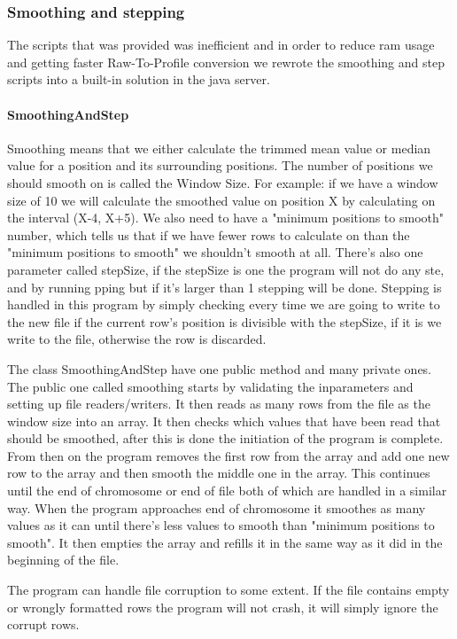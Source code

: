 \subsubsection{Smoothing and stepping}
The scripts that was provided was inefficient and in order to reduce ram usage and getting faster Raw-To-Profile conversion we rewrote the smoothing and step scripts into a built-in solution in the java server.

\paragraph{SmoothingAndStep}
Smoothing means that we either calculate the trimmed mean value or median value for a position and its surrounding positions. The number of positions we should smooth on is called the Window Size. For example: if we have a window size of 10 we will calculate the smoothed value on position X by calculating on the interval (X-4, X+5). We also need to have a "minimum positions to smooth" number, which tells us that if we have fewer rows to calculate on than the "minimum positions to smooth" we shouldn't smooth at all. There's also one parameter called stepSize, if the stepSize is one the program will not do any ste,  and by running
pping but if it's larger than 1 stepping will be done. Stepping is handled in this program by simply checking every time we are going to write to the new file if the current row's position is divisible with the stepSize, if it is we write to the file, otherwise the row is discarded.

The class SmoothingAndStep have one public method and many private ones. The public one called smoothing starts by validating the inparameters and setting up file readers/writers. It then reads as many rows from the file as the window size into an array. It then checks which values that have been read that should be smoothed, after this is done the initiation of the program is complete. From then on the program removes the first row from the array and add one new row to the array and then smooth the middle one in the array. This continues until the end of chromosome or end of file both of which are handled in a similar way. When the program approaches end of chromosome it smoothes as many values as it can until there's less values to smooth than "minimum positions to smooth". It then empties the array and refills it in the same way as it did in the beginning of the file.

The program can handle file corruption to some extent. If the file contains empty or wrongly formatted rows the program will not crash, it will simply ignore the corrupt rows.

